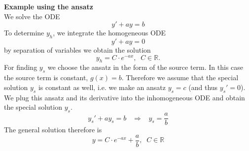 \textbf{Example using the ansatz}\\
We solve the ODE
\begin{equation}
  y' + ay = b
\end{equation}
To determine $y_h$, we integrate the homogeneous ODE
\begin{equation}
  y' + ay = 0
\end{equation}
by separation of variables we obtain the solution
\begin{equation}
  y_h = C \cdot e^{-ax}, \;\; C \in \mathbb{R}.
\end{equation}
For finding $y_s$ we choose the ansatz in the form of the source term. In this case the source term is constant, $g(x) = b$. Therefore we assume that the special solution $y_s$ is constant as well, i.e. we make an ansatz $y_s = c$ (and thus $y_s' = 0$). We plug this ansatz and its derivative into the inhomogeneous ODE and obtain the special solution $y_s$.
\begin{equation}
  y_s'+ay_s = b \;\;\; \Rightarrow \;\;\; y_s = \frac{a}{b}
\end{equation}
The general solution therefore is
\begin{equation}
  y = C \cdot e^{-ax} + \frac{a}{b}, \;\; C \in \mathbb{R}
\end{equation}

